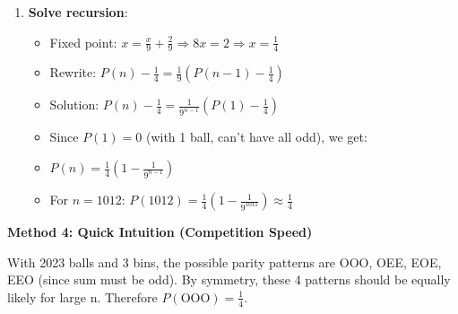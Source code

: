 \documentclass[12pt]{article}
\begin{document}
\begin{solutionbox}
\begin{enumerate}
    \item \textbf{Solve recursion}:
    \begin{itemize}
        \item Fixed point: $x = \frac{x}{9} + \frac{2}{9} \Rightarrow 8x = 2 \Rightarrow x = \frac{1}{4}$
        \item Rewrite: $P(n) - \frac{1}{4} = \frac{1}{9}(P(n-1) - \frac{1}{4})$
        \item Solution: $P(n) - \frac{1}{4} = \frac{1}{9^{n-1}}(P(1) - \frac{1}{4})$
        \item Since $P(1) = 0$ (with 1 ball, can't have all odd), we get:
        \item $P(n) = \frac{1}{4}(1 - \frac{1}{9^{n-1}})$
        \item For $n = 1012$: $P(1012) = \frac{1}{4}(1 - \frac{1}{9^{1011}}) \approx \frac{1}{4}$
    \end{itemize}
\end{enumerate}

\textbf{Method 4: Quick Intuition (Competition Speed)}

With 2023 balls and 3 bins, the possible parity patterns are OOO, OEE, EOE, EEO (since sum must be odd). By symmetry, these 4 patterns should be equally likely for large n. Therefore $P(\text{OOO}) = \frac{1}{4}$.

\end{solutionbox}
\end{document}
